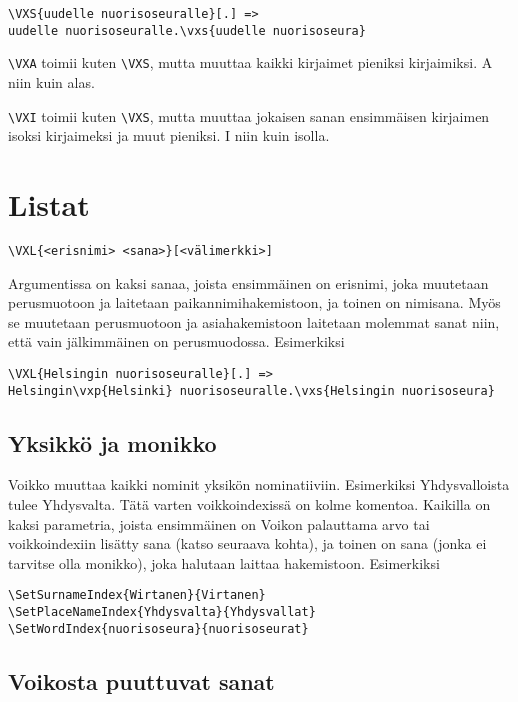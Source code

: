 \documentclass[12pt]{article}
\begin{document}
\begin{verbatim}
\VXS{uudelle nuorisoseuralle}[.] =>
uudelle nuorisoseuralle.\vxs{uudelle nuorisoseura}
\end{verbatim}


\verb=\VXA= toimii kuten \verb=\VXS=, mutta muuttaa kaikki kirjaimet
pieniksi kirjaimiksi. A niin kuin alas.

\verb=\VXI= toimii kuten \verb=\VXS=, mutta muuttaa jokaisen sanan
ensimmäisen kirjaimen isoksi kirjaimeksi ja muut pieniksi.
I niin kuin isolla.


\section*{Listat}


\begin{verbatim}
\VXL{<erisnimi> <sana>}[<välimerkki>]
\end{verbatim}

Argumentissa on kaksi sanaa, joista ensimmäinen on erisnimi, joka
muutetaan perusmuotoon ja laitetaan paikannimihakemistoon, ja toinen
on nimisana. Myös se muutetaan perusmuotoon ja asiahakemistoon
laitetaan molemmat sanat niin, että vain jälkimmäinen on
perusmuodossa. Esimerkiksi

\begin{verbatim}
\VXL{Helsingin nuorisoseuralle}[.] =>
Helsingin\vxp{Helsinki} nuorisoseuralle.\vxs{Helsingin nuorisoseura}
\end{verbatim}


\subsection*{Yksikkö ja monikko}

Voikko muuttaa kaikki nominit yksikön nominatiiviin. Esimerkiksi
Yhdysvalloista tulee Yhdysvalta. Tätä varten voikkoindexissä on kolme
komentoa. Kaikilla on kaksi parametria, joista ensimmäinen on Voikon
palauttama arvo tai voikkoindexiin lisätty sana (katso seuraava
kohta), ja toinen on sana (jonka ei tarvitse olla monikko), joka
halutaan laittaa hakemistoon. Esimerkiksi

\begin{verbatim}
\SetSurnameIndex{Wirtanen}{Virtanen}
\SetPlaceNameIndex{Yhdysvalta}{Yhdysvallat}
\SetWordIndex{nuorisoseura}{nuorisoseurat}
\end{verbatim}


\subsection*{Voikosta puuttuvat sanat}
\end{document}
